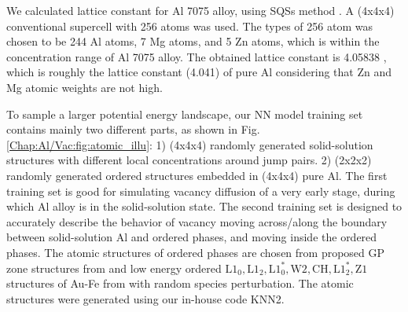 We calculated lattice constant for Al 7075 alloy, using \acfp{SQS} method \cite{zunger1990special}. A (4x4x4) conventional supercell with 256 atoms was used. The types of 256 atom was chosen to be 244 Al atoms, 7 Mg atoms, and 5 Zn atoms, which is within the concentration range of Al 7075 alloy. The obtained lattice constant is 4.05838 \angstrom, which is roughly the lattice constant (4.041\angstrom) of pure Al considering that Zn and Mg atomic weights are not high. \cite{haas2009calculation}


To sample a larger potential energy landscape, our \ac{NN} model training set contains mainly two different parts, as shown in Fig. \ref{Chap:Al/Vac:fig:atomic_illu}: 1) (4x4x4) randomly generated solid-solution structures with different local concentrations around jump pairs. 2) (2x2x2) randomly generated ordered structures embedded in (4x4x4) pure Al. The first training set is good for simulating vacancy diffusion of a very early stage, during which Al alloy is in the solid-solution state. The second training set is designed to accurately describe the behavior of vacancy moving across/along the boundary between solid-solution Al and ordered phases, and moving inside the ordered phases. The atomic structures of ordered phases are chosen from proposed GP zone structures from \cite{berg2001gp} and low energy ordered $\text{L1}_\text{0}, \text{L1}_\text{2}, \text{L1}_\text{0}^*, \text{W2}, \text{CH}, \text{L1}_\text{2}^*, \text{Z1}$ structures of Au-Fe from \cite{zhuravlev2017phase} with random species perturbation. The atomic  structures were generated using our in-house code KNN2. \cite{Zhang2020KNN2}


